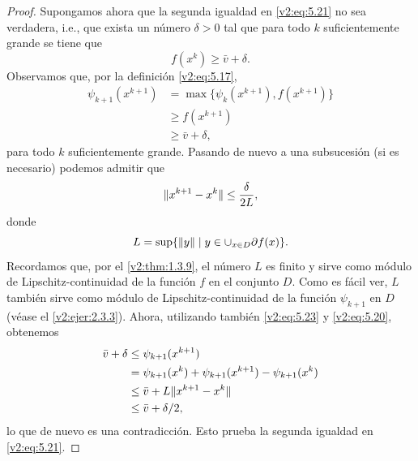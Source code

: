 \begin{proof}
    Supongamos ahora que la segunda igualdad en \eqref{v2:eq:5.21} no sea verdadera, i.e., que exista un número $\delta > 0$ tal que para todo $k$ suficientemente grande se tiene que
    \[
        f(x^k) \ge \bar{v} + \delta.
    \]
    Observamos que, por la definición \eqref{v2:eq:5.17},
    \begin{align}
        \psi_{k+1}(x^{k+1}) &= \max \{ \psi_k(x^{k+1}), f(x^{k+1}) \} \nonumber \\
        &\ge f(x^{k+1}) \nonumber \\
        &\ge \bar{v} + \delta, \label{v2:eq:5.23}
    \end{align}
    para todo $k$ suficientemente grande.
    Pasando de nuevo a una subsucesión (si es necesario) podemos admitir que
    \[
        \lVert x^{k+1} - x^k\rVert \le \frac{\delta}{2L},
    \]
    donde
    \[
        L = \sup \{ \lVert y\rVert \mid y \in \cup_{x \in D} \partial f(x) \}.
    \]
    Recordamos que, por el \cref{v2:thm:1.3.9}, el número $L$ es finito y sirve como módulo de Lipschitz-continuidad de la función $f$ en el conjunto $D$. Como es fácil ver, $L$ también sirve como módulo de Lipschitz-continuidad de la función $\psi_{k+1}$ en $D$ (véase el \cref{v2:ejer:2.3.3}). Ahora, utilizando también \eqref{v2:eq:5.23} y \eqref{v2:eq:5.20}, obtenemos
    \begin{align*}
        \bar{v} + \delta &\le \psi_{k+1}(x^{k+1}) \\
        &= \psi_{k+1}(x^k) + \psi_{k+1}(x^{k+1}) - \psi_{k+1}(x^k) \\
        &\le \bar{v} + L \lVert x^{k+1} - x^k\rVert \\
        &\le \bar{v} + \delta/2,
    \end{align*}
    lo que de nuevo es una contradicción. Esto prueba la segunda igualdad en \eqref{v2:eq:5.21}.
\end{proof}
